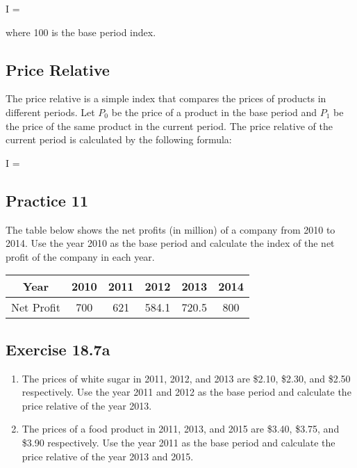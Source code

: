\documentclass{report}
\begin{document}
\begin{multicols}{2}
  \begin{cequation}
    I =  
  \end{cequation}

  \noindent where 100 is the base period index.

  \subsection*{Price Relative}

  The price relative is a simple index that compares the prices of products in
  different periods. Let $P_0$ be the price of a product in the base period and
  $P_1$ be the price of the same product in the current period. The price
  relative of the current period is calculated by the following formula:

  \begin{cequation}
    I =  
  \end{cequation}

  \subsection{Practice 11}

  The table below shows the net profits (in million) of a company from 2010 to
  2014. Use the year 2010 as the base period and calculate the index of the net
  profit of the company in each year.
  \begin{center}
    \begin{tabular}{|c|c|c|c|c|c|}
      \hline
      Year       & 2010 & 2011 & 2012  & 2013  & 2014 \\
      \hline
      Net Profit & 700  & 621  & 584.1 & 720.5 & 800  \\
      \hline
    \end{tabular}
  \end{center}

  \subsection{Exercise 18.7a}

  \begin{enumerate}
    \item The prices of white sugar in 2011, 2012, and 2013 are \$2.10, \$2.30, and
          \$2.50 respectively. Use the year 2011 and 2012 as the base period and
          calculate the price relative of the year 2013.

    \item The prices of a food product in 2011, 2013, and 2015 are \$3.40, \$3.75, and
          \$3.90 respectively. Use the year 2011 as the base period and calculate the
          price relative of the year 2013 and 2015.


\end{enumerate}
\end{multicols}
\end{document}

